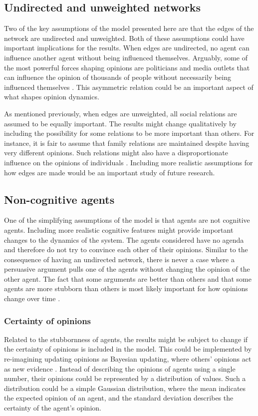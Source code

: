 \documentclass[11pt]{article}
\begin{document}
\subsection{Undirected and unweighted networks}
Two of the key assumptions of the model presented here are that the edges of the network are undirected and unweighted. Both of these assumptions could have important implications for the results. When edges are undirected, no agent can influence another agent without being influenced themselves. Arguably, some of the most powerful forces shaping opinions are politicians and media outlets that can influence the opinion of thousands of people without necessarily being influenced themselves \cite{wilson_polarization_2020}. This asymmetric relation could be an important aspect of what shapes opinion dynamics. 

As mentioned previously, when edges are unweighted, all social relations are assumed to be equally important. The results might change qualitatively by including the possibility for some relations to be more important than others. For instance, it is fair to assume that family relations are maintained despite having very different opinions. Such relations might also have a disproportionate influence on the opinions of individuals \cite{burg1994families}. Including more realistic assumptions for how edges are made would be an important study of future research.

\subsection{Non-cognitive agents}
One of the simplifying assumptions of the model is that agents are not cognitive agents. Including more realistic cognitive features might provide important changes to the dynamics of the system. The agents considered have no agenda and therefore do not try to convince each other of their opinions. Similar to the consequence of having an undirected network, there is never a case where a persuasive argument pulls one of the agents without changing the opinion of the other agent. The fact that some arguments are better than others and that some agents are more stubborn than others is most likely important for how opinions change over time \cite{flache_models_2017,ghaderi_opinion_2014,yildiz_binary_2013}.

\subsubsection{Certainty of opinions}
Related to the stubbornness of agents, the results might be subject to change if the certainty of opinions is included in the model. This could be implemented by re-imagining updating opinions as Bayesian updating, where others' opinions act as new evidence \cite{allahverdyan_opinion_2014}. Instead of describing the opinions of agents using a single number, their opinions could be represented by a distribution of values. Such a distribution could be a simple Gaussian distribution, where the mean indicates the expected opinion of an agent, and the standard deviation describes the certainty of the agent's opinion. 
\end{document}
